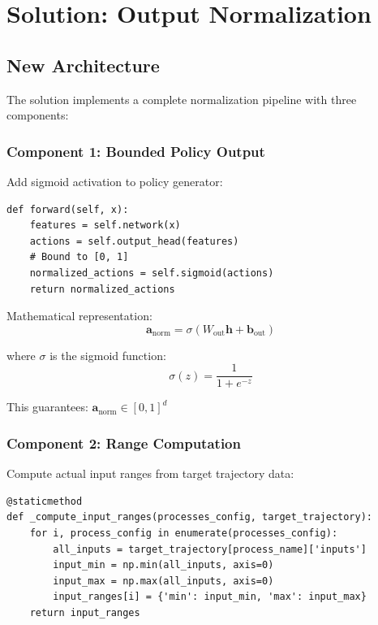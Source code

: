 \documentclass[11pt,a4paper]{article}
\begin{document}
\section{Solution: Output Normalization}

\subsection{New Architecture}

The solution implements a complete normalization pipeline with three components:

\subsubsection{Component 1: Bounded Policy Output}

Add sigmoid activation to policy generator:

\begin{lstlisting}[caption={New PolicyGenerator forward pass}]
def forward(self, x):
    features = self.network(x)
    actions = self.output_head(features)
    # Bound to [0, 1]
    normalized_actions = self.sigmoid(actions)
    return normalized_actions
\end{lstlisting}

Mathematical representation:
\begin{equation}
\mathbf{a}_{\text{norm}} = \sigma(W_{\text{out}} \mathbf{h} + \mathbf{b}_{\text{out}})
\end{equation}

where $\sigma$ is the sigmoid function:
\begin{equation}
\sigma(z) = \frac{1}{1 + e^{-z}}
\end{equation}

This guarantees: $\mathbf{a}_{\text{norm}} \in [0, 1]^d$

\subsubsection{Component 2: Range Computation}

Compute actual input ranges from target trajectory data:

\begin{lstlisting}[caption={Range computation}]
@staticmethod
def _compute_input_ranges(processes_config, target_trajectory):
    for i, process_config in enumerate(processes_config):
        all_inputs = target_trajectory[process_name]['inputs']
        input_min = np.min(all_inputs, axis=0)
        input_max = np.max(all_inputs, axis=0)
        input_ranges[i] = {'min': input_min, 'max': input_max}
    return input_ranges
\end{lstlisting}
\end{document}
